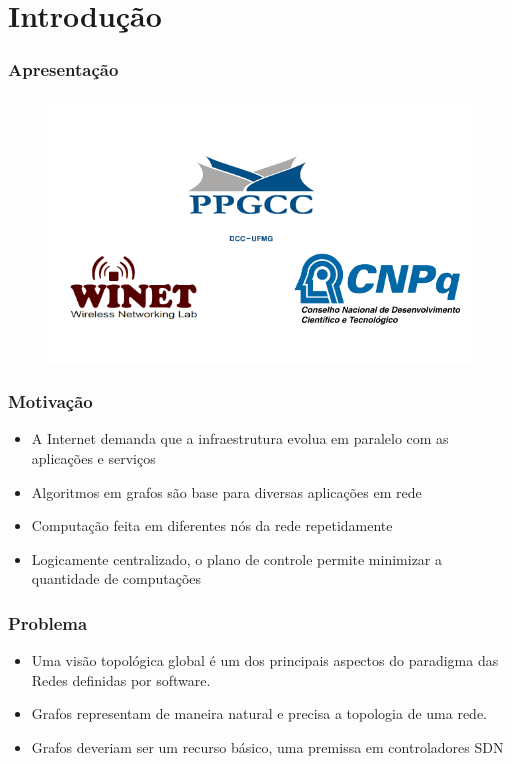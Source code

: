 %
%
\section{Introdução}


%
%
\begin{frame}\frametitle{Apresentação}

	\begin{figure}[h]
        \centering
        \includegraphics[scale=0.5]{images/community.png}
    \end{figure}
\end{frame}


%
%
\begin{frame}\frametitle{Motivação}
   
    \begin{itemize}
        \setlength{\itemsep}{1cm}
        \item A Internet demanda que a infraestrutura evolua em paralelo com 
            as aplicações e serviços
        \item Algoritmos em grafos são base para diversas aplicações em rede
        \item Computação feita em diferentes nós da rede repetidamente
        \item Logicamente centralizado, o plano de controle permite 
            minimizar a quantidade de computações
    \end{itemize}
\end{frame}


%
%
\begin{frame}\frametitle{Problema}
    \begin{itemize}
        \setlength{\itemsep}{1cm}
        \item Uma visão topológica global é um dos principais aspectos do 
              paradigma das Redes definidas por software.
        \item Grafos representam de maneira natural e precisa a topologia 
            de uma rede.
        \item Grafos deveriam ser um recurso básico, uma premissa em 
            controladores SDN
    \end{itemize} 
\end{frame}


